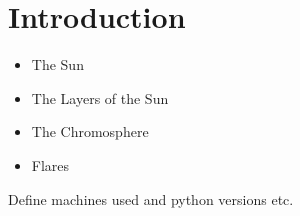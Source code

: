 \chapter{Introduction}

\begin{itemize}
    \item The Sun
    \item The Layers of the Sun
    \item The Chromosphere
    \item Flares
\end{itemize}





Define machines used and python versions etc.